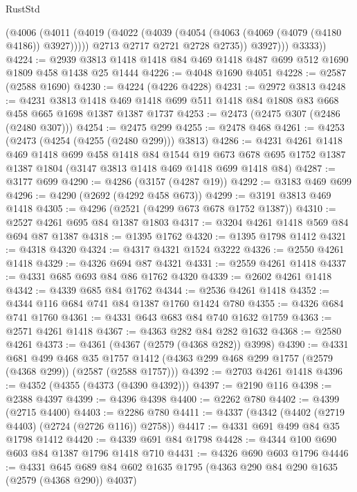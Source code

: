 \begin{lexlean}{RustStd}
\begin{coremodule}
{\begin{coremodule}
{{{{{{{{{{            (@4006
              (@4011
                (@4019
                  (@4022 (@4039 (@4054 (@4063 (@4069 (@4079 (@4180 @4186)) @3927)))))
                  @2713
                  @2717
                  @2721
                  @2728
                  @2735))
              @3927)))
        @3333))
@4224 := @2939 @3813 @1418 @1418 @84 @469 @1418 @487 @699 @512 @1690 @1809 @458 @1438 @25 @1444
@4226 := @4048 @1690 @4051
@4228 := @2587 (@2588 @1690)
@4230 := @4224 (@4226 @4228)
@4231 := @2972 @3813
@4248 := @4231
    @3813
    @1418
    @469
    @1418
    @699
    @511
    @1418
    @84
    @1808
    @83
    @668
    @458
    @665
    @1698
    @1387
    @1387
    @1737
@4253 := @2473 (@2475 @307 (@2486 (@2480 @307)))
@4254 := @2475 @299
@4255 := @2478 @468
@4261 := @4253 (@2473 (@4254 (@4255 (@2480 @299))) @3813)
@4286 := @4231
    @4261
    @1418
    @469
    @1418
    @699
    @458
    @1418
    @84
    @1544
    @19
    @673
    @678
    @695
    @1752
    @1387
    @1387
    @1804
    (@3147 @3813 @1418 @469 @1418 @699 @1418 @84)
@4287 := @3177 @699
@4290 := @4286 (@3157 (@4287 @19))
@4292 := @3183 @469 @699
@4296 := @4290 (@2692 (@4292 @458 @673))
@4299 := @3191 @3813 @469 @1418
@4305 := @4296 (@2521 (@4299 @673 @678 @1752 @1387))
@4310 := @2527 @4261 @695 @84 @1387 @1803
@4317 := @3204 @4261 @1418 @569 @84 @694 @87 @1387
@4318 := @1395 @1762
@4320 := @1395 @1798 @1412
@4321 := @4318 @4320
@4324 := @4317 @4321 @1524 @3222
@4326 := @2550 @4261 @1418
@4329 := @4326 @694 @87 @4321
@4331 := @2559 @4261 @1418
@4337 := @4331 @685 @693 @84 @86 @1762 @4320
@4339 := @2602 @4261 @1418
@4342 := @4339 @685 @84 @1762
@4344 := @2536 @4261 @1418
@4352 := @4344 @116 @684 @741 @84 @1387 @1760 @1424 @780
@4355 := @4326 @684 @741 @1760
@4361 := @4331 @643 @683 @84 @740 @1632 @1759
@4363 := @2571 @4261 @1418
@4367 := @4363 @282 @84 @282 @1632
@4368 := @2580 @4261
@4373 := @4361 (@4367 (@2579 (@4368 @282)) @3998)
@4390 := @4331
    @681
    @499
    @468
    @35
    @1757
    @1412
    (@4363 @299 @468 @299 @1757 (@2579 (@4368 @299)) (@2587 (@2588 @1757)))
@4392 := @2703 @4261 @1418
@4396 := @4352 (@4355 (@4373 (@4390 @4392)))
@4397 := @2190 @116
@4398 := @2388 @4397
@4399 := @4396 @4398
@4400 := @2262 @780
@4402 := @4399 (@2715 @4400)
@4403 := @2286 @780
@4411 := @4337 (@4342 (@4402 (@2719 @4403) (@2724 (@2726 @116)) @2758))
@4417 := @4331 @691 @499 @84 @35 @1798 @1412
@4420 := @4339 @691 @84 @1798
@4428 := @4344 @100 @690 @603 @84 @1387 @1796 @1418 @710
@4431 := @4326 @690 @603 @1796
@4446 := @4331 @645 @689 @84 @602 @1635 @1795 (@4363 @290 @84 @290 @1635 (@2579 (@4368 @290)) @4037)
}}}}}}}}}}
\end{coremodule}}
\end{coremodule}
\end{lexlean}

